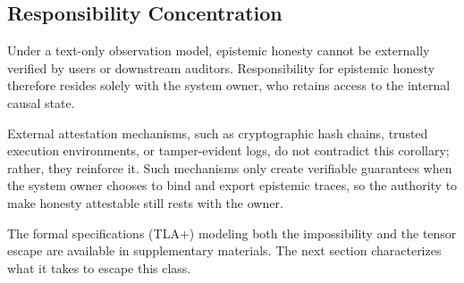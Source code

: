 \subsection{Responsibility Concentration}

\begin{corollary}\label{cor:responsibility}
Under a text-only observation model, epistemic honesty cannot be externally
verified by users or downstream auditors. Responsibility for epistemic honesty
therefore resides solely with the system owner, who retains access to the
internal causal state.
\end{corollary}

External attestation mechanisms, such as cryptographic hash chains, trusted execution
environments, or tamper-evident logs, do not contradict this corollary; rather,
they reinforce it. Such mechanisms only create verifiable guarantees when the
system owner chooses to bind and export epistemic traces, so the authority to
make honesty attestable still rests with the owner.

The formal specifications (TLA+) modeling both the impossibility and the tensor escape are available in supplementary materials. The next section characterizes what it takes to escape this class.
